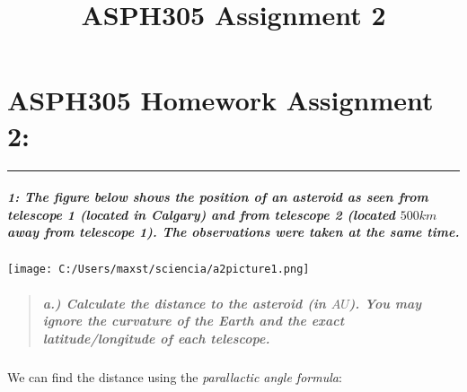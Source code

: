 \documentclass[
]{article}
\title{ASPH305 Assignment 2}
\author{}
\date{}
\begin{document}
\maketitle

\hypertarget{asph305-homework-assignment-2}{%
\section{ASPH305 Homework Assignment
2:}\label{asph305-homework-assignment-2}}

\begin{center}\rule{0.5\linewidth}{0.5pt}\end{center}

\hypertarget{the-figure-below-shows-the-position-of-an-asteroid-as-seen-from-telescope-1-located-in-calgary-and-from-telescope-2-located-500km-away-from-telescope-1.-the-observations-were-taken-at-the-same-time.}{%
\subparagraph{\texorpdfstring{1: The figure below shows the position of
an asteroid as seen from telescope 1 (located in Calgary) and from
telescope 2 (located {\(500km\)} away from telescope 1). The
observations were taken at the same
time.}{1: The figure below shows the position of an asteroid as seen from telescope 1 (located in Calgary) and from telescope 2 (located 500km away from telescope 1). The observations were taken at the same time.}}\label{the-figure-below-shows-the-position-of-an-asteroid-as-seen-from-telescope-1-located-in-calgary-and-from-telescope-2-located-500km-away-from-telescope-1.-the-observations-were-taken-at-the-same-time.}}

\texttt{[image: C:/Users/maxst/sciencia/a2picture1.png]}

\begin{quote}
\mbox{}%
\hypertarget{a.-calculate-the-distance-to-the-asteroid-in-au.-you-may-ignore-the-curvature-of-the-earth-and-the-exact-latitudelongitude-of-each-telescope.}{%
\subparagraph{\texorpdfstring{a.) Calculate the distance to the asteroid
(in {\(AU\)}). You may ignore the curvature of the Earth and the exact
latitude/longitude of each
telescope.}{a.) Calculate the distance to the asteroid (in AU). You may ignore the curvature of the Earth and the exact latitude/longitude of each telescope.}}\label{a.-calculate-the-distance-to-the-asteroid-in-au.-you-may-ignore-the-curvature-of-the-earth-and-the-exact-latitudelongitude-of-each-telescope.}}
\end{quote}

We can find the distance using the \emph{parallactic angle formula}:
\end{document}
